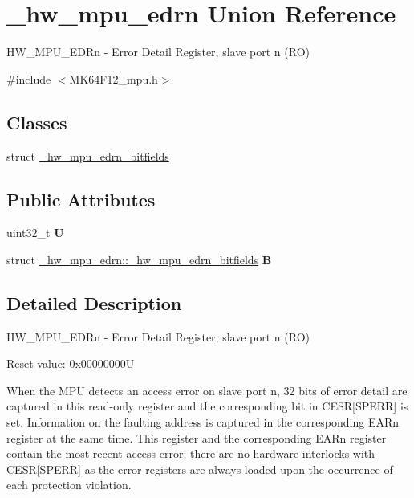 \hypertarget{union__hw__mpu__edrn}{}\section{\+\_\+hw\+\_\+mpu\+\_\+edrn Union Reference}
\label{union__hw__mpu__edrn}


H\+W\+\_\+\+M\+P\+U\+\_\+\+E\+D\+Rn -\/ Error Detail Register, slave port n (RO)  




{\ttfamily \#include $<$M\+K64\+F12\+\_\+mpu.\+h$>$}

\subsection*{Classes}
\begin{DoxyCompactItemize}
\item 
struct \hyperlink{struct__hw__mpu__edrn_1_1__hw__mpu__edrn__bitfields}{\+\_\+hw\+\_\+mpu\+\_\+edrn\+\_\+bitfields}
\end{DoxyCompactItemize}
\subsection*{Public Attributes}
\begin{DoxyCompactItemize}
\item 
uint32\+\_\+t {\bfseries U}\hypertarget{union__hw__mpu__edrn_a9f150039ad0fab2dfb45deb585bf8bc5}{}\label{union__hw__mpu__edrn_a9f150039ad0fab2dfb45deb585bf8bc5}

\item 
struct \hyperlink{struct__hw__mpu__edrn_1_1__hw__mpu__edrn__bitfields}{\+\_\+hw\+\_\+mpu\+\_\+edrn\+::\+\_\+hw\+\_\+mpu\+\_\+edrn\+\_\+bitfields} {\bfseries B}\hypertarget{union__hw__mpu__edrn_afcb51991532abdba85ee0e54aa0fcfbb}{}\label{union__hw__mpu__edrn_afcb51991532abdba85ee0e54aa0fcfbb}

\end{DoxyCompactItemize}


\subsection{Detailed Description}
H\+W\+\_\+\+M\+P\+U\+\_\+\+E\+D\+Rn -\/ Error Detail Register, slave port n (RO) 

Reset value\+: 0x00000000U

When the M\+PU detects an access error on slave port n, 32 bits of error detail are captured in this read-\/only register and the corresponding bit in C\+E\+SR\mbox{[}S\+P\+E\+RR\mbox{]} is set. Information on the faulting address is captured in the corresponding E\+A\+Rn register at the same time. This register and the corresponding E\+A\+Rn register contain the most recent access error; there are no hardware interlocks with C\+E\+SR\mbox{[}S\+P\+E\+RR\mbox{]} as the error registers are always loaded upon the occurrence of each protection violation. 

